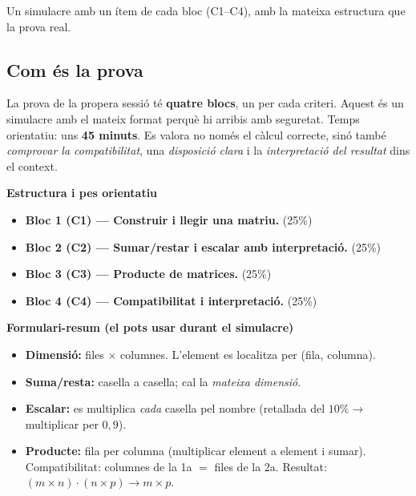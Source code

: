 %
{Un simulacre amb un ítem de cada bloc (C1–C4), amb la mateixa estructura que la prova real.}

\subsection*{Com és la prova}

La prova de la propera sessió té \textbf{quatre blocs}, un per cada criteri. Aquest
és un simulacre amb el mateix format perquè hi arribis amb seguretat. Temps
orientatiu: uns \textbf{45 minuts}. Es valora no només el càlcul correcte, sinó
també \emph{comprovar la compatibilitat}, una \emph{disposició clara} i la
\emph{interpretació del resultat} dins el context.

\begin{idea}
\textbf{Estructura i pes orientatiu}
\begin{itemize}[leftmargin=1.4em, itemsep=2pt]
  \item \textbf{Bloc 1 (C1) — Construir i llegir una matriu.} \;(25\%)
  \item \textbf{Bloc 2 (C2) — Sumar/restar i escalar amb interpretació.} \;(25\%)
  \item \textbf{Bloc 3 (C3) — Producte de matrices.} \;(25\%)
  \item \textbf{Bloc 4 (C4) — Compatibilitat i interpretació.} \;(25\%)
\end{itemize}
\end{idea}

\begin{idea}
\textbf{Formulari-resum (el pots usar durant el simulacre)}
\begin{itemize}[leftmargin=1.4em, itemsep=2pt]
  \item \textbf{Dimensió:} files $\times$ columnes. L'element es localitza per
        (fila, columna).
  \item \textbf{Suma/resta:} casella a casella; cal la \emph{mateixa dimensió}.
  \item \textbf{Escalar:} es multiplica \emph{cada} casella pel nombre (retallada
        del $10\%\rightarrow$ multiplicar per $0{,}9$).
  \item \textbf{Producte:} fila per columna (multiplicar element a element i sumar).
        Compatibilitat: columnes de la 1a $=$ files de la 2a. Resultat:
        $(m\times n)\cdot(n\times p)\rightarrow m\times p$.
\end{itemize}
\end{idea}

